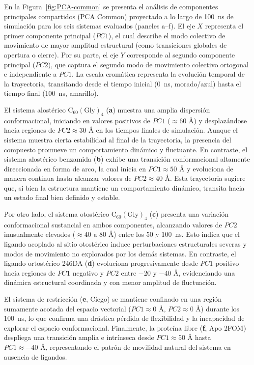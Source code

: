 En la Figura~\ref{fig:PCA-common} se presenta el análisis de componentes principales compartidos (PCA Common) proyectado a lo largo de 100~ns de simulación para los seis sistemas evaluados (paneles a--f). El eje $X$ representa el primer componente principal ($PC1$), el cual describe el modo colectivo de movimiento de mayor amplitud estructural (como transiciones globales de apertura o cierre). Por su parte, el eje $Y$ corresponde al segundo componente principal ($PC2$), que captura el segundo modo de movimiento colectivo ortogonal e independiente a $PC1$. La escala cromática representa la evolución temporal de la trayectoria, transitando desde el tiempo inicial (0~ns, morado/azul) hasta el tiempo final (100~ns, amarillo).

El sistema alostérico $\text{C}_{60}(\text{Gly})_4$ (\textbf{a}) muestra una amplia dispersión conformacional, iniciando en valores positivos de $PC1$ ($\approx 60\text{ \AA}$) y desplazándose hacia regiones de $PC2 \approx 30\text{ \AA}$ en los tiempos finales de simulación. Aunque el sistema muestra cierta estabilidad al final de la trayectoria, la presencia del compuesto promueve un comportamiento dinámico y fluctuante. En contraste, el sistema alostérico benzamida (\textbf{b}) exhibe una transición conformacional altamente direccionada en forma de arco, la cual inicia en $PC1 \approx 50\text{ \AA}$ y evoluciona de manera continua hasta alcanzar valores de $PC2 \approx 40\text{ \AA}$. Esta trayectoria sugiere que, si bien la estructura mantiene un comportamiento dinámico, transita hacia un estado final bien definido y estable.

Por otro lado, el sistema otostérico $\text{C}_{60}(\text{Gly})_4$ (\textbf{c}) presenta una variación conformacional sustancial en ambos componentes, alcanzando valores de $PC2$ inusualmente elevados ($\approx 40\text{ a }80\text{ \AA}$) entre los 50 y 100~ns. Esto indica que el ligando acoplado al sitio otostérico induce perturbaciones estructurales severas y modos de movimiento no explorados por los demás sistemas. En contraste, el ligando ortostérico 246DA (\textbf{d}) evoluciona progresivamente desde $PC1$ positivo hacia regiones de $PC1$ negativo y $PC2$ entre $-20$ y $-40\text{ \AA}$, evidenciando una dinámica estructural coordinada y con menor amplitud de fluctuación.

El sistema de restricción (\textbf{e}, Ciego) se mantiene confinado en una región sumamente acotada del espacio vectorial ($PC1 \approx 0\text{ \AA}$, $PC2 \approx 0\text{ \AA}$) durante los 100~ns, lo que confirma una drástica pérdida de flexibilidad y la incapacidad de explorar el espacio conformacional. Finalmente, la proteína libre (\textbf{f}, Apo 2FOM) despliega una transición amplia e intrínseca desde $PC1 \approx 50\text{ \AA}$ hasta $PC1 \approx -40\text{ \AA}$, representando el patrón de movilidad natural del sistema en ausencia de ligandos.

